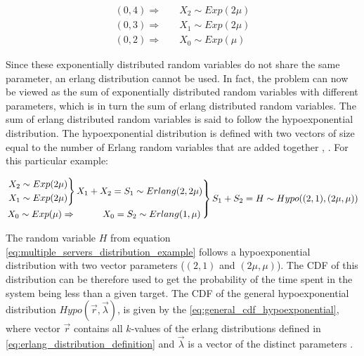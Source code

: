 \begin{align}
    (0,4) \Rightarrow \quad & X_2 \sim Exp(2\mu) \nonumber \\
    (0,3) \Rightarrow \quad & X_1 \sim Exp(2\mu) \\
    (0,2) \Rightarrow \quad & X_0 \sim Exp(\mu) \nonumber
\end{align}

Since these exponentially distributed random variables do not share the same
parameter, an erlang distribution cannot be used.
In fact, the problem can now be viewed as the sum of exponentially
distributed random variables with different parameters, which is in turn the
sum of erlang distributed random variables.
The sum of erlang distributed random variables is said to follow the
hypoexponential distribution.
The hypoexponential distribution is defined with two vectors of size equal
to the number of Erlang random variables that are added together
\cite{Akkouchi2008}, \cite{Smaili2013}.
For this particular example:

\footnotesize
\begin{align} \label{eq:multiple_servers_distribution_example}
    \begin{rcases}
        \begin{rcases}
            X_2 \sim Exp(2\mu) \\
            X_1 \sim Exp(2\mu)
        \end{rcases}
        X_1 + X_2 = S_1 \sim Erlang(2, 2\mu) \\
        X_0 \sim Exp(\mu) \Rightarrow \hspace{1cm} X_0 = S_2 \sim Erlang(1, \mu)
    \end{rcases}
    S_1 + S_2 = H \sim Hypo((2,1), (2\mu, \mu))
\end{align}
\normalsize

The random variable \(H\) from equation
\ref{eq:multiple_servers_distribution_example} follows a hypoexponential
distribution with two vector parameters (\((2,1)\) and \((2\mu, \mu)\)).
The CDF of this distribution can be therefore used to get the probability of the
time spent in the system being less than a given target.
The CDF of the general hypoexponential distribution \(Hypo(\vec{r},
\vec{\lambda})\), is given by the \ref{eq:general_cdf_hypoexponential}, where
vector \(\vec{r}\) contains all \(k\)-values of the erlang distributions
defined in \ref{eq:erlang_distribution_definition} and \(\vec{\lambda}\)
is a vector of the distinct parameters \cite{Favaro2010}.

